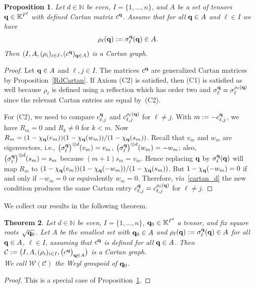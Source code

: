 \documentclass[pdftex]{sigma}
\numberwithin{equation}{section}
\newtheorem{Theorem}{Theorem}[section]
\newtheorem{Proposition}[Theorem]{Proposition}
\newcommand{\NN }{\mathbb{N}}
\newcommand{\Cc }{\mathcal{C}}
\newcommand{\Wg }{\mathcal{W}}
\newcommand{\qq }{{\bf q}}
\newcommand{\KK }{\mathbb{K}}
\newcommand{\dn }{d}
\newcommand{\bich }{\chi}
\begin{document}
\begin{Proposition}\label{RdGraph}
Let $\dn\in \NN$ be even, $I=\{1,\dots,n\}$, and
$A$ be a set of tensors $\qq\in \KK^{I^\dn}$ with defined Cartan matrix $c^\qq$.
Assume that for all $\qq\in A$ and $\ell\in I$ we have
\[ \rho_\ell(\qq):=\sigma^{\qq}_\ell (\qq) \in A. \]
Then $(I,A,(\rho_i)_{i\in I},(c^\qq)_{\qq\in A})$ is a Cartan graph.
\end{Proposition}
\begin{proof}
Let $\qq\in A$ and $\ell,j \in I$.
The matrices $c^\qq$ are generalized Cartan matrices by Proposition~\ref{RdCartan}.
If Axiom (C2) is satisfied, then (C1) is satisfied as well because $\rho_\ell$ is defined using a reflection which has order two and $\sigma^{\qq}_\ell = \sigma^{\rho_\ell(\qq)}_\ell$ since the relevant Cartan entries are equal by~(C2).

For (C2), we need to compare $c^\qq_{\ell,j}$ and $c^{\rho_\ell(\qq)}_{\ell,j}$ for $\ell\ne j$.
With $m:=-c^\qq_{\ell,j}$, we have $R_m=0$ and $R_k\ne 0$ for $k<m$.
Now $R_m = (1-\bich_\qq(v_m))(1-\bich_\qq(w_m))/(1-\chi_\qq(s_m))$.
Recall that $v_m$ and $w_m$ are eigenvectors, i.e., $\big(\sigma^{\qq}_\ell\big)^{\otimes \dn}(v_m) = v_m$,
$\big(\sigma^{\qq}_\ell\big)^{\otimes \dn}(w_m) = -w_m$;
also, $\big(\sigma^{\qq}_\ell\big)^{\otimes \dn}(s_m) = s_m$ because $(m+1)s_m=v_m$.
Hence replacing $\qq$ by $\sigma^{\qq}_\ell (\qq)$ will map $R_m$ to
$(1-\bich_\qq(v_m))(1-\bich_\qq(-w_m))/(1-\chi_\qq(s_m))$.
But $1-\bich_\qq(-w_m)=0$ if and only if $-w_m=0$ or equivalently $w_m=0$.
Therefore, via~\eqref{cartan_d} the new condition produces the same Cartan entry
$c^\qq_{\ell,j}=c^{\rho_\ell(\qq)}_{\ell,j}$ for $\ell\ne j$.
\end{proof}

We collect our results in the following theorem.

\begin{Theorem}\label{wg_from_q}
Let $\dn\in \NN$ be even, $I=\{1,\dots,n\}$, $\qq_0\in \KK^{I^\dn}$ a tensor, and fix square roots~$\sqrt{\qq_0}$.
Let $A$ be the smallest set with $\qq_0\in A$ and $\rho_\ell(\qq):=\sigma^{\qq}_\ell (\qq)\in A$ for all $\qq\in A$, $\ell\in I$,
assuming that $c^\qq$ is defined for all $\qq\in A$.
Then
$\Cc:=\big(I,A,(\rho_i)_{i\in I},\big(c^\qq\big)_{\qq\in A}\big)$ is a Cartan graph.
\\
We call $\Wg(\Cc)$ the {\it Weyl groupoid} of $\qq_0$.
\end{Theorem}

\begin{proof}
This is a special case of Proposition~\ref{RdGraph}.
\end{proof}
\end{document}
